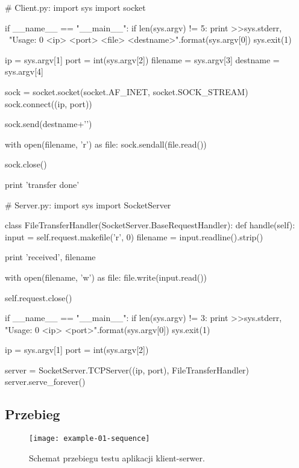 \documentclass[00-praca-magisterska.tex]{subfiles}
\begin{document}
\begin{pythoncode}
  # Client.py:
  import sys
  import socket

  if __name__ == "__main__":
      if len(sys.argv) != 5:
	  print >>sys.stderr, \
	      "Usage: {0} <ip> <port> <file> <destname>".format(sys.argv[0])
	  sys.exit(1)

      ip = sys.argv[1]
      port = int(sys.argv[2])
      filename = sys.argv[3]
      destname = sys.argv[4]

      sock = socket.socket(socket.AF_INET, socket.SOCK_STREAM)
      sock.connect((ip, port))

      sock.send(destname+'\n')

      with open(filename, 'r') as file:
          sock.sendall(file.read())

      sock.close()

      print 'transfer done'

\end{pythoncode}

\begin{pythoncode}
  # Server.py:
  import sys
  import SocketServer

  class FileTransferHandler(SocketServer.BaseRequestHandler):
      def handle(self):
          input  = self.request.makefile('r', 0)
          filename = input.readline().strip()

          print 'received', filename

          with open(filename, 'w') as file:
	      file.write(input.read())
  
          self.request.close()

  if __name__ == "__main__":
      if len(sys.argv) != 3:
          print >>sys.stderr, "Usage: {0} <ip> <port>".format(sys.argv[0])
          sys.exit(1)

      ip = sys.argv[1]
      port = int(sys.argv[2])

      server = SocketServer.TCPServer((ip, port), FileTransferHandler)
      server.serve_forever()

\end{pythoncode}

\subsection{Przebieg}

\begin{figure}[htb]
\begin{center}
\leavevmode
\texttt{[image: example-01-sequence]}
\end{center}
\caption{Schemat przebiegu testu aplikacji klient-serwer.}
\label{fig:example-01-sequence}
\end{figure}
\end{document}
